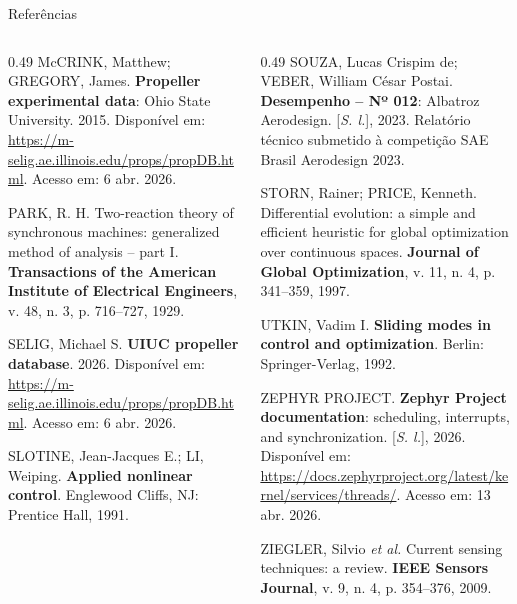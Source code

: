 \begin{frame}{Referências}
  \scriptsize
  \begin{columns}[t]
    \begin{column}{0.49\textwidth}\setlength{\parskip}{0.6em}
      McCRINK, Matthew; GREGORY, James. \textbf{Propeller experimental
      data}: Ohio State University. 2015. Disponível em:
      \url{https://m-selig.ae.illinois.edu/props/propDB.html}. Acesso em: 6 abr.
      2026.

      PARK, R. H. Two-reaction theory of synchronous machines: generalized
      method of analysis -- part I. \textbf{Transactions of the American
      Institute of Electrical Engineers}, v. 48, n. 3, p. 716--727, 1929.

      SELIG, Michael S. \textbf{UIUC propeller database}. 2026. Disponível
      em: \url{https://m-selig.ae.illinois.edu/props/propDB.html}. Acesso em: 6
      abr. 2026.

      SLOTINE, Jean-Jacques E.; LI, Weiping. \textbf{Applied nonlinear
      control}. Englewood Cliffs, NJ: Prentice Hall, 1991.

    \end{column}
    \begin{column}{0.49\textwidth}\setlength{\parskip}{0.6em}
      SOUZA, Lucas Crispim de; VEBER, William César Postai.
      \textbf{Desempenho -- Nº 012}: Albatroz Aerodesign. [\textit{S. l.}],
      2023. Relatório técnico submetido à competição SAE Brasil Aerodesign
      2023.

      STORN, Rainer; PRICE, Kenneth. Differential evolution: a simple and
      efficient heuristic for global optimization over continuous spaces.
      \textbf{Journal of Global Optimization}, v. 11, n. 4, p. 341--359,
      1997.

      UTKIN, Vadim I. \textbf{Sliding modes in control and optimization}.
      Berlin: Springer-Verlag, 1992.

      ZEPHYR PROJECT. \textbf{Zephyr Project documentation}: scheduling,
      interrupts, and synchronization. [\textit{S. l.}], 2026. Disponível
      em: \url{https://docs.zephyrproject.org/latest/kernel/services/threads/}.
      Acesso em: 13 abr. 2026.

      ZIEGLER, Silvio \textit{et al.} Current sensing techniques: a review.
      \textbf{IEEE Sensors Journal}, v. 9, n. 4, p. 354--376, 2009.
    \end{column}
  \end{columns}
\end{frame}
